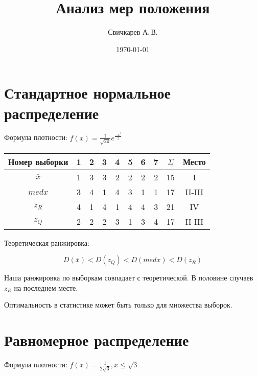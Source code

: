 \documentclass{article} %
\title{Анализ мер положения} %
\author{Свичкарев А.\,В.} %
\date{\today} %
\begin{document}

\maketitle %

\section{Стандартное нормальное распределение}

Формула плотности:
\( f(x) = \frac{1}{\sqrt{ 2\pi }}e^{\frac{-x^2}{2}} \)

\begin{center}
	\begin{tabular}{|c| c|c|c|c|c|c|c| c|c|} \hline
		Номер выборки & 1 & 2 & 3 & 4 & 5 & 6 & 7 & \(\Sigma\) & Место \\ \hline
		\(\bar{x}\) & 1 & 3 & 3 & 2 & 2 & 2 & 2 & 15 & I \\ \hline
		\(medx\) & 3 & 4 & 1 & 4 & 3 & 1 & 1 & 17 & II-III \\ \hline
		\(z_R\) & 4 & 1 & 4 & 1 & 4 & 4 & 3 & 21 & IV \\ \hline
		\(z_Q\) & 2 & 2 & 2 & 3 & 1 & 3 & 4 & 17 & II-III \\ \hline
	\end{tabular}
\end{center}

Теоретическая ранжировка:

\[ D(\bar{x}) < D(z_Q) < D(medx) < D(z_R) \]

Наша ранжировка по выборкам совпадает с теоретической. В половине случаев \(z_R\) на последнем месте.

Оптимальность в статистике может быть только для множества выборок.

\section{Равномерное распределение}

Формула плотности:
\( f(x) = \frac{1}{2\sqrt{3}}, x \leq \sqrt{3} \)
\end{document}
